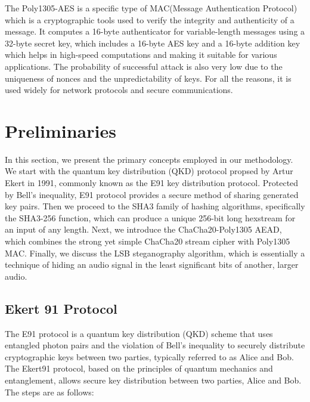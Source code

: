 \documentclass{article}
\begin{document}
The Poly1305-AES is a specific type of MAC(Message Authentication Protocol) which is a cryptographic tools used to verify the integrity and authenticity of a message.\cite{bernstein2005poly1305} It computes a 16-byte authenticator for variable-length messages using a 32-byte secret key, which includes a 16-byte AES key and a 16-byte addition key which helps in high-speed computations and making it suitable for various applications.\cite{bernstein2005poly1305} The probability of successful attack is also very low due to the uniqueness of nonces and the unpredictability of keys. For all the reasons, it is used widely for network protocols and secure communications.
\section{Preliminaries}
\label{sec:preliminaries}
In this section, we present the primary concepts employed in our methodology. We start with the quantum key distribution (QKD) protocol propsed by Artur Ekert in 1991, commonly known as the E91 key distribution protocol. Protected by Bell's inequality, E91 protocol provides a secure method of sharing generated key pairs. Then we proceed to the SHA3 family of hashing algorithms, specifically the SHA3-256 function, which can produce a unique 256-bit long hexstream for an input of any length. Next, we introduce the ChaCha20-Poly1305 AEAD, which combines the strong yet simple ChaCha20 stream cipher with Poly1305 MAC. Finally, we discuss the LSB steganography algorithm, which is essentially a technique of hiding an audio signal in the least significant bits of another, larger audio.
\subsection{Ekert 91 Protocol}
\label{sec:e91}
The E91 protocol is a quantum key distribution (QKD) scheme that uses entangled photon pairs and the violation of Bell's inequality to securely distribute cryptographic keys between two parties, typically referred to as Alice and Bob.
The Ekert91 protocol, based on the principles of quantum mechanics and entanglement, allows secure key distribution between two parties, Alice and Bob. The steps are as follows:
\end{document}
